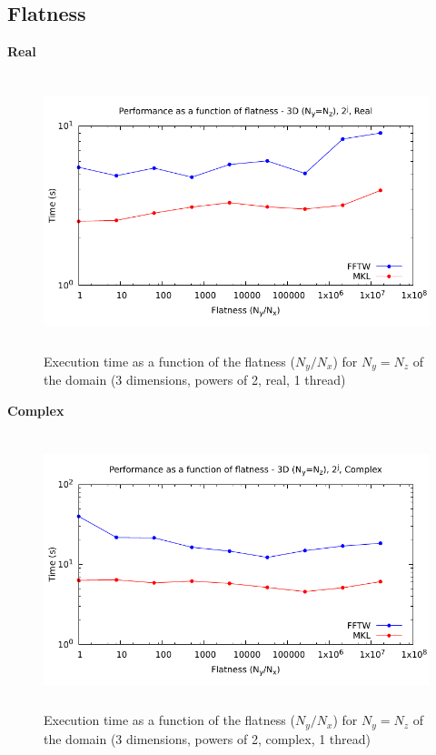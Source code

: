 \documentclass[12pt, a4paper]{article}
\begin{document}
\subsection{Flatness}
{\bf Real}
\begin{figure}[H]
\captionsetup{width=0.6\textwidth}
\centering
\includegraphics[height=8cm]{graphs/performance/3d-flatness-pow2-r.pdf}
\caption{Execution time as a function of the flatness ($N_y/N_x$) for $N_y=N_z$ of the domain  (3 dimensions, powers of 2, real, 1 thread)}
\label{FLATNESSR}
\end{figure}   
{\bf Complex}
\begin{figure}[H]
\captionsetup{width=0.6\textwidth}
\centering
\includegraphics[height=8cm]{graphs/performance/3d-flatness-pow2-c.pdf}
\caption{Execution time as a function of the flatness ($N_y/N_x$) for $N_y=N_z$ of the domain  (3 dimensions, powers of 2, complex, 1 thread)}
\label{FLATNESSC}
\end{figure}   
\end{document}
